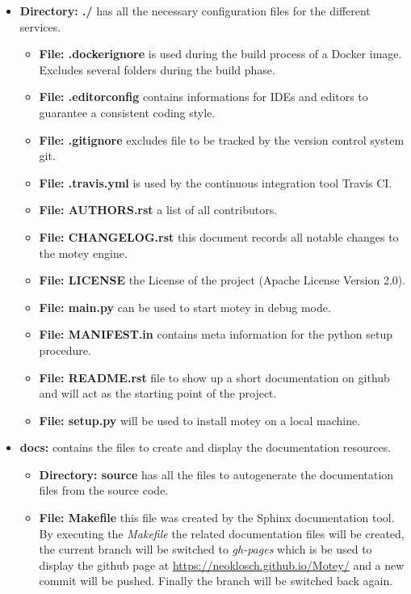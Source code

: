 \begin{itemize}
  \item{\textbf{Directory: ./}} has all the necessary configuration files for the different services.
  \begin{itemize}
    \item{\textbf{File: .dockerignore}} is used during the build process of a Docker image. Excludes several folders during the build phase.
    \item{\textbf{File: .editorconfig}} contains informations for \acp{IDE} and editors to guarantee a consistent coding style.
    \item{\textbf{File: .gitignore}} excludes file to be tracked by the version control system git.
    \item{\textbf{File: .travis.yml}} is used by the continuous integration tool Travis CI.
    \item{\textbf{File: AUTHORS.rst}} a list of all contributors.
    \item{\textbf{File: CHANGELOG.rst}} this document records all notable changes to the motey engine.
    \item{\textbf{File: LICENSE}} the License of the project (Apache License Version 2.0).
    \item{\textbf{File: main.py}} can be used to start motey in debug mode.
    \item{\textbf{File: MANIFEST.in}} contains meta information for the python setup procedure.
    \item{\textbf{File: README.rst}} file to show up a short documentation on github and will act as the starting point of the project.
    \item{\textbf{File: setup.py}} will be used to install motey on a local machine.
  \end{itemize}
  \item{\textbf{docs:}} contains the files to create and display the documentation resources.
  \begin{itemize}
    \item{\textbf{Directory: source}} has all the files to autogenerate the documentation files from the source code.
    \item{\textbf{File: Makefile}} this file was created by the Sphinx documentation tool. By executing the \textit{Makefile} the related documentation files will be created, the current branch will be switched to \textit{gh-pages} which is be used to display the github page at \url{https://neoklosch.github.io/Motey/} and a new commit will be pushed. Finally the branch will be switched back again.

\end{itemize}
\end{itemize}
